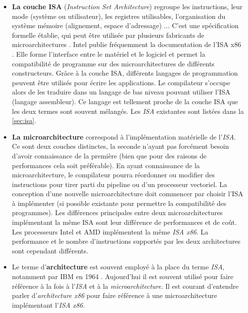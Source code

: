 \begin{itemize}
    \item  \textbf{La couche ISA} (\textit{Instruction Set Architecture}) regroupe les instructions, leur mode (système ou utilisateur), les registres utilisables, l'organisation du système mémoire (alignement, espace d'adressage) ... 
    C'est une spécification formelle établie, qui peut être utilisée par plusieurs fabricants de microarchitectures \cite{tanenbaum2016structured}. Intel publie fréquemment la documentation de l'ISA x86 \cite{guide2011intel}. Elle forme l'interface entre le matériel et le logiciel et permet la compatibilité de programme sur des microarchitectures de différents constructeurs. 
    Grâce à la couche ISA, différents langages de programmation peuvent être utilisés pour écrire les applications. Le compilateur s'occupe alors de les traduire dans un langage de bas niveau pouvant utiliser l'ISA (langage assembleur). Ce langage est tellement proche de la couche ISA que les deux termes sont souvent mélangés. Les \textit{ISA} existantes sont listées dans la \autoref{sec:isa}. 

    \item \textbf{La microarchitecture} correspond à l'implémentation matérielle de l'\textit{ISA}. Ce sont deux couches distinctes, la seconde n'ayant pas forcément besoin d'avoir connaissance de la première (bien que pour des raisons de performances cela soit préférable). En ayant connaissance de la microarchitecture, le compilateur pourra réordonner ou modifier des instructions pour tirer parti du pipeline ou d'un processeur vectoriel. La conception d'une nouvelle microarchitecture doit commencer par choisir l'ISA à implémenter (si possible existante pour permettre la compatibilité des programmes). Les différences principales entre deux microarchitectures implémentant la même ISA sont leur différence de performances et de coût. Les processeurs Intel et AMD implémentent la même \textit{ISA x86}. La performance et le nombre d'instructions supportés par les deux architectures sont cependant différents.
    
    \item Le terme d'\textbf{architecture} est souvent employé à la place du terme \textit{ISA}, notamment par IBM en 1964 \cite{amdahl1964architecture}.  Aujourd'hui il est souvent utilisé pour faire référence à la fois à l'\textit{ISA} et à la \textit{microarchitecture}. Il est courant d'entendre parler d'\textit{architecture x86} pour faire référence à une microarchitecture implémentant l'\textit{ISA x86}.\\ 
\end{itemize}



